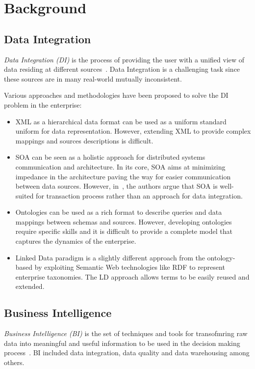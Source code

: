 \chapter{Background} \label{chapter:part2-background}
\graphicspath{{Part2/Background/figures/}}

\section{Data Integration}\label{section:dataIntegration}

\textit{Data Integration (DI)} is the process of providing the user with a unified view of data residing at different sources~\cite{Lenzerini:DIT:02}. Data Integration is a challenging task since these sources are in many real-world mutually inconsistent.

Various approaches and methodologies have been proposed to solve the DI problem in the enterprise:
\begin{itemize}
	\item XML as a hierarchical data format can be used as a uniform standard uniform for data representation. However, extending XML to provide complex mappings and sources descriptions is difficult.
	\item SOA can be seen as a holistic approach for distributed systems communication and architecture. In its core, SOA aims at minimizing impedance in the architecture paving the way for easier communication between data sources. However, in~\cite{Frischmuth:ISWC:13}, the authors argue that SOA is well-suited for transaction process rather than an approach for data integration.
	\item Ontologies can be used as a rich format to describe queries and data mappings between schemas and sources. However, developing ontologies require specific skills and it is difficult to provide a complete model that captures the dynamics of the enterprise.
	\item Linked Data paradigm is a slightly different approach from the ontology-based by exploiting Semantic Web technologies like RDF to represent enterprise taxonomies. The LD approach allows terms to be easily reused and extended.
\end{itemize}

\section{Business Intelligence}\label{section:businessIntelligence}

\textit{Business Intelligence (BI)} is the set of techniques and tools for transofmring raw data into meaningful and useful information to be used in the decision making process~\cite{Rud:Wiley:09}. BI included data integration, data quality and data warehousing among others.